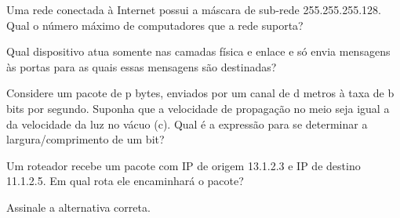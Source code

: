 \documentclass[10pt,a4paper]{article}
\begin{document}
%
{
\def\AMCbeginQuestion#1#2{\par\noindent{\bf (POSCOMP 2023 - Questão 65)}}
\begin{question}{} Uma rede conectada à Internet possui a máscara de sub-rede 255.255.255.128. Qual o número máximo de computadores que a rede suporta?
\begin{choices}
\end{choices}
\end{question}
}
%
{
\def\AMCbeginQuestion#1#2{\par\noindent{\bf (POSCOMP 2023 - Questão 66)}}
\begin{question}{} Qual dispositivo atua somente nas camadas física e enlace e só envia mensagens às portas para as quais essas mensagens são destinadas?
\begin{choices}
\end{choices}
\end{question}
}
%
{
\def\AMCbeginQuestion#1#2{\par\noindent{\bf (POSCOMP 2023 - Questão 67)}}
\begin{question}{} Considere um pacote de p bytes, enviados por um canal de d metros à taxa de b bits por segundo. Suponha que a velocidade de propagação no meio seja igual a da velocidade da luz no vácuo (c). Qual é a expressão para se determinar a largura/comprimento de um bit?
\begin{choices}
\end{choices}
\end{question}
}
%
{
\def\AMCbeginQuestion#1#2{\par\noindent{\bf (POSCOMP 2024 - Questão 65)}}
\begin{question}{} Um roteador recebe um pacote com IP de origem 13.1.2.3 e IP de destino 11.1.2.5. Em qual rota ele encaminhará o pacote?
\begin{choices}
\end{choices}
\end{question}
}
%
{
\def\AMCbeginQuestion#1#2{\par\noindent{\bf (POSCOMP 2024 - Questão 66)}}
\begin{question}{} Assinale a alternativa correta.
\begin{choices}
\end{choices}
\end{question}
}
\end{document}
